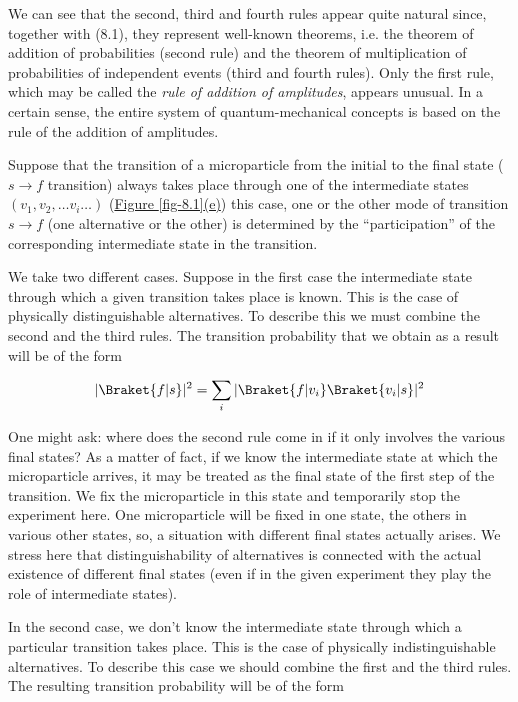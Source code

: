 \documentclass[a4paper,sfsidenotes,colorlinks=true]{tufte-book}
\numberwithin{equation}{section}
\numberwithin{figure}{section}
\begin{document}
We can see that the second, third and fourth rules appear quite
natural since, together with (8.1), they represent well-known
theorems, i.e. the theorem of addition of probabilities (second rule)
and the theorem of multiplication of probabilities of independent
events (third and fourth rules). Only the first rule, which may be
called the \emph{rule of addition of amplitudes}, appears unusual. In
a certain sense, the entire system of quantum-mechanical concepts is
based on the rule of the addition of amplitudes. 

Suppose  that the transition of a
microparticle from the initial to the final state ($s \to f$
transition) always takes place through one of the intermediate states
$(v_{1}, v_{2}, \ldots v_{i} \ldots)$ (\hyperref[fig-8.1]{Figure
  \ref{fig-8.1}(e)}) this case, one or the other mode of transition $s
\to f$ (one alternative or the other) is determined by the
``participation'' of the corresponding intermediate state in the
transition.

We take two different cases. Suppose in the first case the
intermediate state through which a given transition takes place is
known. This is the case of physically distinguishable alternatives. To
describe this we must combine the second and the third rules. The
transition probability that we obtain as a result will be of the form

\begin{equation}%
|\Braket{f |s}|^{2} =  \sum_{i} |\Braket{f|v_{i}} \Braket{v_{i}|s}|^{2}
\label{eq-8.6} 
\end{equation}


One might ask: where does the second rule come in if it only involves the various final states? As a matter of fact, if we know the intermediate state at which the microparticle arrives, it may be treated as the final state of the first step of the transition. We fix the microparticle in this state and temporarily stop the experiment here. One microparticle will be fixed in one state, the others in various other states, so, a situation with different final states actually arises. We stress here that distinguishability of alternatives is connected with the actual existence of different final states (even if in the given experiment they play the role of intermediate states).


In the second case, we don't know the intermediate state through which
a particular transition takes place. This is the case of physically
indistinguishable alternatives. To describe this case we should
combine the first and the third rules. The resulting transition
probability will be of the form
\end{document}
